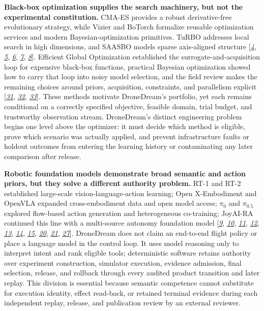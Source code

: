 \textbf{Black-box optimization supplies the search machinery, but not
the experimental constitution.} CMA-ES provides a robust derivative-free
evolutionary strategy, while Vizier and BoTorch formalize reusable
optimization services and modern Bayesian-optimization primitives. TuRBO
addresses local search in high dimensions, and SAASBO models sparse
axis-aligned structure {[}\protect\hyperlink{ref_4}{\emph{4}},
\protect\hyperlink{ref_5}{\emph{5}},
\protect\hyperlink{ref_6}{\emph{6}},
\protect\hyperlink{ref_7}{\emph{7}},
\protect\hyperlink{ref_8}{\emph{8}}{]}. Efficient Global Optimization
established the surrogate-and-acquisition loop for expensive black-box
functions, practical Bayesian optimization showed how to carry that loop
into noisy model selection, and the field review makes the remaining
choices around priors, acquisition, constraints, and parallelism
explicit {[}\protect\hyperlink{ref_31}{\emph{31}},
\protect\hyperlink{ref_32}{\emph{32}},
\protect\hyperlink{ref_33}{\emph{33}}{]}. These methods motivate
DroneDream's portfolio, yet each remains conditional on a correctly
specified objective, feasible domain, trial budget, and trustworthy
observation stream. DroneDream's distinct engineering problem begins one
level above the optimizer: it must decide which method is eligible,
prove which scenario was actually applied, and prevent infrastructure
faults or holdout outcomes from entering the learning history or
contaminating any later comparison after release.

\textbf{Robotic foundation models demonstrate broad semantic and action
priors, but they solve a different authority problem.} RT-1 and RT-2
established large-scale vision-language-action learning; Open
X-Embodiment and OpenVLA expanded cross-embodiment data and open model
access; \(\pi_0\) and \(\pi_{0.5}\) explored flow-based action generation and
heterogeneous co-training; JoyAI-RA continued this line with a
multi-source autonomy foundation model
{[}\protect\hyperlink{ref_9}{\emph{9}},
\protect\hyperlink{ref_10}{\emph{10}},
\protect\hyperlink{ref_11}{\emph{11}},
\protect\hyperlink{ref_12}{\emph{12}},
\protect\hyperlink{ref_13}{\emph{13}},
\protect\hyperlink{ref_14}{\emph{14}},
\protect\hyperlink{ref_15}{\emph{15}},
\protect\hyperlink{ref_20}{\emph{20}},
\protect\hyperlink{ref_21}{\emph{21}},
\protect\hyperlink{ref_27}{\emph{27}}{]}. DroneDream does not claim an
end-to-end flight policy or place a language model in the control loop.
It uses model reasoning only to interpret intent and rank eligible
tools; deterministic software retains authority over experiment
construction, simulator execution, evidence admission, final selection,
release, and rollback through every audited product transition and later
replay. This division is essential because semantic competence cannot
substitute for execution identity, effect read-back, or retained terminal
evidence during each independent replay, release, and publication review
by an external reviewer.

